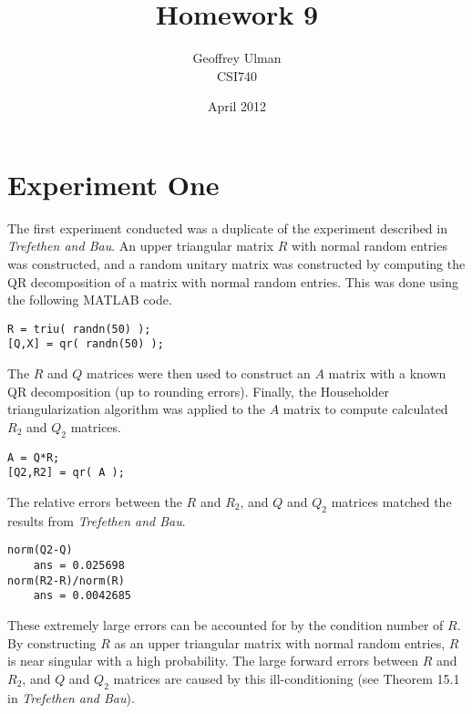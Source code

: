 \documentclass{article}
\begin{document}
\title{Homework 9}
\author{Geoffrey Ulman\\
        CSI740}
\date{April 2012}
\maketitle

\section{Experiment One}\label{m1}

The first experiment conducted was a duplicate of the experiment described in \emph{Trefethen and Bau}. An upper triangular matrix \(R\) with normal random entries was constructed, and a random unitary matrix was constructed by computing the QR decomposition of a matrix with normal random entries. This was done using the following MATLAB code.

\begin{framed}
\begin{verbatim}
R = triu( randn(50) );
[Q,X] = qr( randn(50) );
\end{verbatim}
\end{framed}

The \(R\) and \(Q\) matrices were then used to construct an \(A\) matrix with a known QR decomposition (up to rounding errors). Finally, the Householder triangularization algorithm was applied to the \(A\) matrix to compute calculated \(R_2\) and \(Q_2\) matrices.

\begin{framed}
\begin{verbatim}
A = Q*R;
[Q2,R2] = qr( A );
\end{verbatim}
\end{framed}

The relative errors between the \(R\) and \(R_2\), and \(Q\) and \(Q_2\) matrices matched the results from \emph{Trefethen and Bau}.

\begin{framed}
\begin{verbatim}
norm(Q2-Q)
    ans = 0.025698
norm(R2-R)/norm(R)
    ans = 0.0042685
\end{verbatim}
\end{framed}

These extremely large errors can be accounted for by the condition number of \(R\). By constructing \(R\) as an upper triangular matrix with normal random entries, \(R\) is near singular with a high probability. The large forward errors between \(R\) and \(R_2\), and \(Q\) and \(Q_2\) matrices are caused by this ill-conditioning (see Theorem 15.1 in \emph{Trefethen and Bau}).
\end{document}
